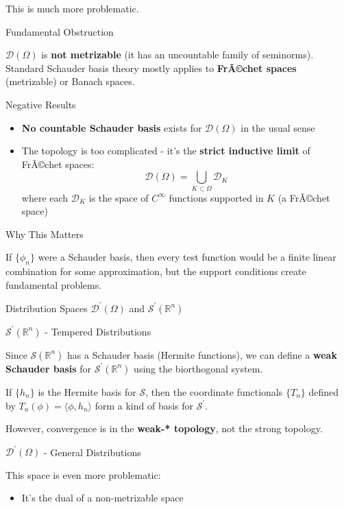 \documentclass[aps,preprint]{revtex4}
\newenvironment{answer}
  {\begin{tcolorbox}[colback=green!5!white,colframe=green!75!black,title=Answer]}
  {\end{tcolorbox}}
\begin{document}
\begin{answer}
This is much more problematic.

Fundamental Obstruction

$\mathcal{D}(\Omega)$ is \textbf{not metrizable} (it has an uncountable
family of seminorms). Standard Schauder basis theory mostly applies to 
\textbf{Fr\~{A}\copyright chet spaces} (metrizable) or Banach spaces.

Negative Results

\begin{itemize}
\item \textbf{No countable Schauder basis} exists for $\mathcal{D}(\Omega)$
in the usual sense

\item The topology is too complicated - it's the \textbf{strict inductive
limit} of Fr\~{A}\copyright chet spaces: 
\begin{equation*}
\mathcal{D}(\Omega) = \bigcup_{K \subset \Omega} \mathcal{D}_K
\end{equation*}
where each $\mathcal{D}_K$ is the space of $C^\infty$ functions supported in 
$K$ (a Fr\~{A}\copyright chet space)
\end{itemize}

Why This Matters

If $\{\phi_n\}$ were a Schauder basis, then every test function would be a
finite linear combination for some approximation, but the support conditions
create fundamental problems.

Distribution Spaces $\mathcal{D}^{\prime }(\Omega)$ and $\mathcal{S}^{\prime
}(\mathbb{R}^n)$

$\mathcal{S}^{\prime }(\mathbb{R}^n)$ - Tempered Distributions

Since $\mathcal{S}(\mathbb{R}^n)$ has a Schauder basis (Hermite functions),
we can define a \textbf{weak Schauder basis} for $\mathcal{S}^{\prime }(%
\mathbb{R}^n)$ using the biorthogonal system.

If $\{h_n\}$ is the Hermite basis for $\mathcal{S}$, then the coordinate
functionals $\{T_n\}$ defined by $T_n(\phi) = \langle \phi, h_n \rangle$
form a kind of basis for $\mathcal{S}^{\prime }$.

However, convergence is in the \textbf{weak-* topology}, not the strong
topology.

$\mathcal{D}^{\prime }(\Omega)$ - General Distributions

This space is even more problematic:

\begin{itemize}
\item It's the dual of a non-metrizable space


\end{itemize}
\end{answer}
\end{document}
